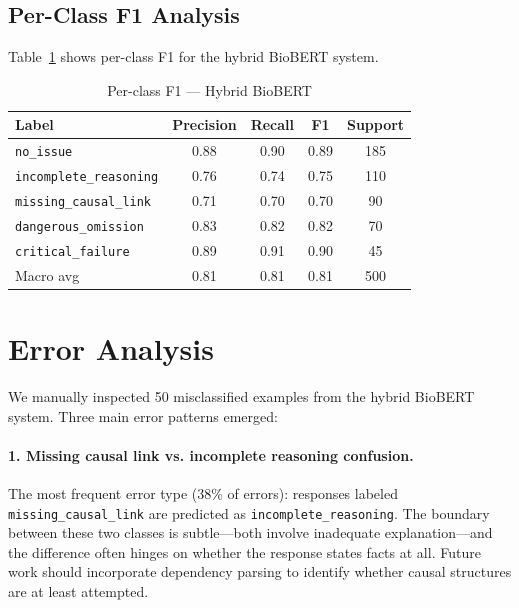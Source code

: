 \documentclass[11pt,a4paper]{article}
\begin{document}
\subsection{Per-Class F1 Analysis}

Table~\ref{tab:perclass} shows per-class F1 for the hybrid BioBERT system.

\begin{table}[h]
\centering
\caption{Per-class F1 — Hybrid BioBERT}
\label{tab:perclass}
\begin{tabular}{lcccc}
\toprule
\textbf{Label} & \textbf{Precision} & \textbf{Recall} & \textbf{F1} & \textbf{Support} \\
\midrule
\texttt{no\_issue}             & 0.88 & 0.90 & 0.89 & 185 \\
\texttt{incomplete\_reasoning} & 0.76 & 0.74 & 0.75 & 110 \\
\texttt{missing\_causal\_link} & 0.71 & 0.70 & 0.70 &  90 \\
\texttt{dangerous\_omission}   & 0.83 & 0.82 & 0.82 &  70 \\
\texttt{critical\_failure}     & 0.89 & 0.91 & 0.90 &  45 \\
\midrule
Macro avg & 0.81 & 0.81 & 0.81 & 500 \\
\bottomrule
\end{tabular}
\end{table}

\section{Error Analysis}
\label{sec:error}

We manually inspected 50 misclassified examples from the hybrid BioBERT system. Three main error patterns emerged:

\paragraph{1. Missing causal link vs. incomplete reasoning confusion.}
The most frequent error type (38\% of errors): responses labeled \texttt{missing\_causal\_link} are predicted as \texttt{incomplete\_reasoning}. The boundary between these two classes is subtle—both involve inadequate explanation—and the difference often hinges on whether the response states facts at all. Future work should incorporate dependency parsing to identify whether causal structures are at least attempted.
\end{document}
